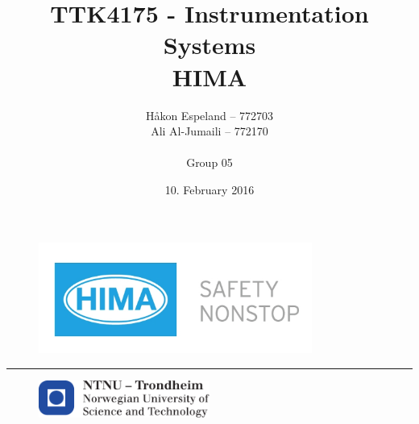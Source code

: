 \documentclass{article}
\title{TTK4175 - Instrumentation Systems\\\Large{\textbf{HIMA}}}
\author{Håkon Espeland -- 772703 \\ Ali Al-Jumaili -- 772170 \\\\ Group 05}
\date{10. February 2016}
\begin{document}
\begin{figure}
    \centering
    \includegraphics[width=0.8\textwidth]{images/himalab}
    \end{figure}


\begin{titlepage}
    \maketitle
    \rule{\linewidth}{0.5mm}
    \begin{figure}
    \centering
    \includegraphics[width=0.5\textwidth]{images/logontnu_eng}
    \end{figure}
    \thispagestyle{empty}
\end{titlepage}
\newpage\null\thispagestyle{empty}\newpage
\tableofcontents
\thispagestyle{empty} %
\newpage   

\newpage\null\thispagestyle{empty}\newpage

\setcounter{page}{1}




\end{document}
